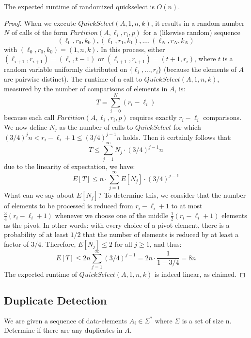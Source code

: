 \begin{theorem}
	The expected runtime of randomized quickselect is $O(n)$.
\end{theorem}

\begin{proof}
	When we execute $QuickSelect(A, 1, n, k)$, it results in a random number $N$ of calls of the form $Partition(A, \ell_i, r_i, p)$ for a (likewise random) sequence
	$$ (\ell_0, r_0, k_0), (\ell_1, r_1, k_1), \dots, (\ell_N, r_N, k_N) $$
	with $(\ell_0, r_0, k_0) = (1, n, k)$. In this process, either $(\ell_{i+1}, r_{i+1}) = (\ell_i, t-1)$ or $(\ell_{i+1}, r_{i+1}) = (t + 1, r_i)$, where $t$ is a random variable uniformly distributed on $\{\ell_i, \dots, r_i\}$ (because the elements of $A$ are pairwise distinct). The runtime of a call to $QuickSelect(A, 1, n, k)$, measured by the number of comparisons of elements in $A$, is:
	$$T = \sum_{i=0}^{N} (r_i - \ell_i)$$
	because each call $Partition(A, \ell_i, r_i, p)$ requires exactly $r_i - \ell_i$ comparisons. We now define $N_j$ as the number of calls to $QuickSelect$ for which $(3/4)^j n < r_i - \ell_i + 1 \le (3/4)^{j-1} n$ holds. Then it certainly follows that:
	$$T \le \sum_{j=1}^{\infty} N_j \cdot (3/4)^{j-1} n$$
	due to the linearity of expectation, we have:
	$$E[T] \le n \cdot \sum_{j=1}^{\infty} E[N_j] \cdot (3/4)^{j-1}$$
	What can we say about $E[N_j]$? To determine this, we consider that the number of elements to be processed is reduced from $r_i - \ell_i + 1$ to at most $\frac{3}{4}(r_i - \ell_i + 1)$ whenever we choose one of the middle $\frac{1}{2}(r_i - \ell_i + 1)$ elements as the pivot. In other words: with every choice of a pivot element, there is a probability of at least $1/2$ that the number of elements is reduced by at least a factor of $3/4$. Therefore, $E[N_j] \le 2$ for all $j \ge 1$, and thus:
	$$E[T] \le 2n \sum_{j=1}^{\infty} (3/4)^{j-1} = 2n \cdot \frac{1}{1 - 3/4} = 8n$$
	The expected runtime of $QuickSelect(A, 1, n, k)$ is indeed linear, as claimed.
\end{proof}

\subsection{Duplicate Detection}

\begin{definition}
	We are given a sequence of data-elements $A_i \in \Sigma^*$ where $\Sigma$ is a set of size n. Determine if there are any duplicates in $A$.
\end{definition}

